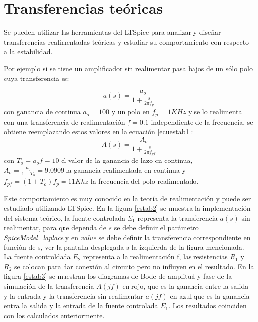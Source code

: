 \section{Transferencias teóricas}

\hspace{10pt} Se pueden utilizar las herramientas del LTSpice para analizar y diseñar transferencias realimentadas teóricas y estudiar su comportamiento con respecto a la estabilidad.

Por ejemplo si se tiene un amplificador sin realimentar pasa bajos de un sólo polo cuya transferencia es:

  \begin{equation}
  	a(s)=\frac{\displaystyle a_o}{\displaystyle 1+\frac{s}{2\pi f_p} }
  \end{equation}
  con  ganancia de continua $a_o=100$ y un polo en $f_p=1KHz$ y se lo realimenta con una transferencia de realimentación $f=0.1$ independiente de la frecuencia, se obtiene reemplazando estos valores en la ecuación \ref{ecuestab1}:
   \begin{equation}
  	A(s)=\frac{\displaystyle A_o}{\displaystyle 1+\frac{s}{2\pi f_{pf}} }
  \end{equation}
  con $T_o=a_of=10$ el valor de la ganancia de lazo en continua,  $A_o=\frac{\displaystyle a_o}{\displaystyle 1+T_o}=9.0909$ la ganancia realimentada en continua y $f_{pf}=(1+T_o)f_p=11Khz$ la frecuencia del polo realimentado. 
  
  Este comportamiento es muy conocido en la teoría de realimentación y puede ser estudiado utilizando LTSpice. En la figura \ref{estab2} se muestra la implementación del sistema teórico, la fuente controlada  $E_1$ representa la transferencia $a(s)$ sin realimentar, para que dependa de $s$ se debe definir el parámetro \textit{SpiceModel=laplace} y en \textit{value} se debe definir la transferencia correspondiente en función de s, ver la pantalla desplegada a la izquierda de la figura mencionada. La fuente controldada $E_2$ representa a la realimentación f, las resistencias $R_1$ y $R_2$ se colocan para dar conexión al circuito pero no influyen en el resultado. En la figura \ref{estab3} se muestran los diagramas de Bode de amplitud y fase de  la simulación de la transferencia $A(jf)$ en rojo, que es la ganancia entre la salida y la entrada y la transferencia sin realimentar $a(jf)$ en azul que es la ganancia entra la salida y la entrada de la fuente controlada $E_1$. Los resultados coinciden con los calculados anteriormente.
  
